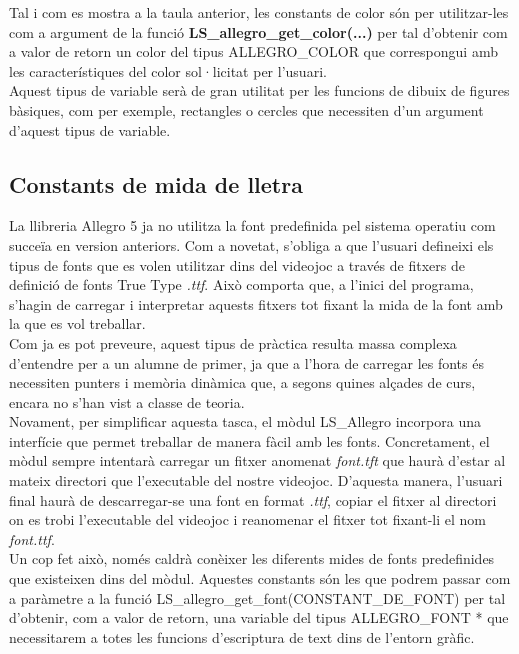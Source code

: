 \documentclass[11pt]{article}
\begin{document}
\noindent Tal i com es mostra a la taula anterior, les constants de color són per utilitzar-les com a argument de la funció \textbf{LS\_allegro\_get\_color(...)} per tal d'obtenir com a valor de retorn un color del tipus ALLEGRO\_COLOR que correspongui amb les característiques del color sol·licitat per l'usuari.\\ Aquest tipus de variable serà de gran utilitat per les funcions de dibuix de figures bàsiques, com per exemple, rectangles o cercles que necessiten d'un argument d'aquest tipus de variable.

\subsection{Constants de mida de lletra}
La llibreria Allegro 5 ja no utilitza la font predefinida pel sistema operatiu com succeïa en version anteriors. Com a novetat, s'obliga a que l'usuari defineixi els tipus de fonts que es volen utilitzar dins del videojoc a través de fitxers de definició de fonts True Type \textit{.ttf}. Això comporta que, a l'inici del programa, s'hagin de carregar i interpretar aquests fitxers tot fixant la mida de la font amb la que es vol treballar.\\

\noindent Com ja es pot preveure, aquest tipus de pràctica resulta massa complexa d'entendre per a un alumne de primer, ja que a l'hora de carregar les fonts és necessiten punters i memòria dinàmica que, a segons quines alçades de curs, encara no s'han vist a classe de teoria.\\

\noindent Novament, per simplificar aquesta tasca, el mòdul LS\_Allegro incorpora una interfície que permet treballar de manera fàcil amb les fonts. Concretament, el mòdul sempre intentarà carregar un fitxer anomenat \textit{font.tft} que haurà d'estar al mateix directori que l'executable del nostre videojoc. D'aquesta manera, l'usuari final haurà de descarregar-se una font en format \textit{.ttf}, copiar el fitxer al directori on es trobi l'executable del videojoc i reanomenar el fitxer tot fixant-li el nom \textit{font.ttf}.\\

\noindent Un cop fet això, només caldrà conèixer les diferents mides de fonts predefinides que existeixen dins del mòdul. Aquestes constants són les que podrem passar com a paràmetre a la funció LS\_allegro\_get\_font(CONSTANT\_DE\_FONT) per tal d'obtenir, com a valor de retorn, una variable del tipus ALLEGRO\_FONT * que necessitarem a totes les funcions d'escriptura de text dins de l'entorn gràfic.
\end{document}
